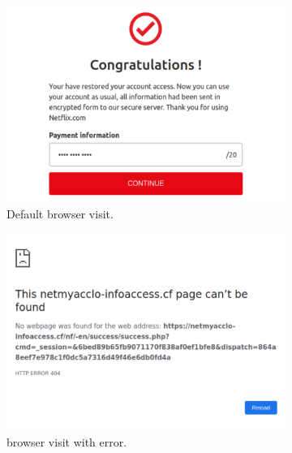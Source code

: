 \begin{figure}
\centering
	\begin{subfigure}[tb]{.31\textwidth}
		\includegraphics[width=\linewidth]{figs/netflix_n.pdf}
        \caption{Default browser visit.}
        \label{fig:normal}
	\end{subfigure}%
	\quad
	\begin{subfigure}[tb]{.31\textwidth}
		\includegraphics[width=\linewidth]{figs/netflix_sp.pdf}
        \caption{\spartacus browser visit with error.}
        \label{fig:sp1}
	\end{subfigure}%
	\quad
	\begin{subfigure}[tb]{.31\textwidth}

\end{subfigure}
\end{figure}
